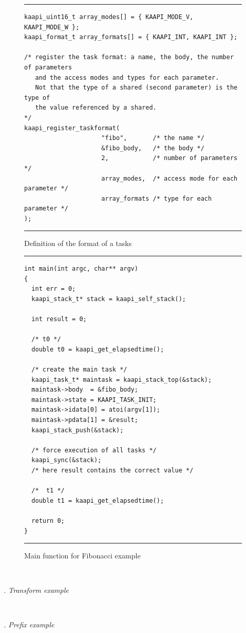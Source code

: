 \documentclass[12pt]{report}
\renewcommand{\subsubsection}[1]{~\\ \addtocounter{subsubsection}{1} \noindent\textit{
\thesubsubsection. #1\\}}
\begin{document}
\begin{figure}
\hrule
\begin{verbatim}
kaapi_uint16_t array_modes[] = { KAAPI_MODE_V, KAAPI_MODE_W };
kaapi_format_t array_formats[] = { KAAPI_INT, KAAPI_INT };

/* register the task format: a name, the body, the number of parameters
   and the access modes and types for each parameter.
   Not that the type of a shared (second parameter) is the type of 
   the value referenced by a shared.
*/
kaapi_register_taskformat(
                     "fibo",       /* the name */
                     &fibo_body,   /* the body */
                     2,            /* number of parameters */
                     array_modes,  /* access mode for each parameter */
                     array_formats /* type for each parameter */
); 
\end{verbatim}
\hrule
\caption{Definition of the format of a tasks}
\label{fig:fiboformat}
\end{figure}

\begin{figure}[!h]
\hrule
\begin{verbatim}
int main(int argc, char** argv)
{
  int err = 0;
  kaapi_stack_t* stack = kaapi_self_stack();

  int result = 0;
  
  /* t0 */
  double t0 = kaapi_get_elapsedtime();
  
  /* create the main task */
  kaapi_task_t* maintask = kaapi_stack_top(&stack);
  maintask->body  = &fibo_body;
  maintask->state = KAAPI_TASK_INIT;
  maintask->idata[0] = atoi(argv[1]);
  maintask->pdata[1] = &result;
  kaapi_stack_push(&stack);
  
  /* force execution of all tasks */
  kaapi_sync(&stack);
  /* here result contains the correct value */

  /*  t1 */
  double t1 = kaapi_get_elapsedtime();

  return 0;
}
\end{verbatim}
\hrule
\caption{Main function for Fibonacci example}
\label{fig:fibomain}
\end{figure}


\subsubsection{Transform example}

\subsubsection{Prefix example}
\end{document}
